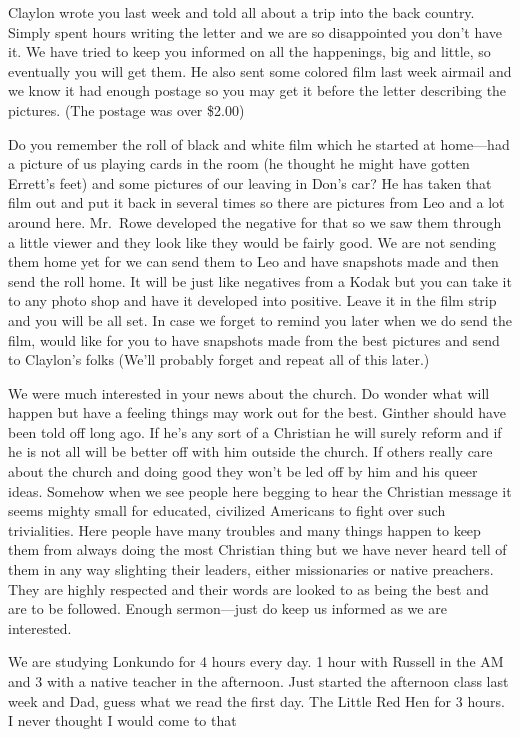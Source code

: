\documentclass[
]{book}
\begin{document}
Claylon wrote you last week and told all about a trip into the back country. Simply spent hours writing the letter and we are so disappointed you don't have it. We have tried to keep you informed on all the happenings, big and little, so eventually you will get them. He also sent some colored film last week airmail and we know it had enough postage so you may get it before the letter describing the pictures. (The postage was over \$2.00)

Do you remember the roll of black and white film which he started at home---had a picture of us playing cards in the room (he thought he might have gotten Errett's feet) and some pictures of our leaving in Don's car? He has taken that film out and put it back in several times so there are pictures from Leo and a lot around here. Mr.~Rowe developed the negative for that so we saw them through a little viewer and they look like they would be fairly good. We are not sending them home yet for we can send them to Leo and have snapshots made and then send the roll home. It will be just like negatives from a Kodak but you can take it to any photo shop and have it developed into positive. Leave it in the film strip and you will be all set. In case we forget to remind you later when we do send the film, would like for you to have snapshots made from the best pictures and send to Claylon's folks (We'll probably forget and repeat all of this later.)

We were much interested in your news about the church. Do wonder what will happen but have a feeling things may work out for the best. Ginther should have been told off long ago. If he's any sort of a Christian he will surely reform and if he is not all will be better off with him outside the church. If others really care about the church and doing good they won't be led off by him and his queer ideas. Somehow when we see people here begging to hear the Christian message it seems mighty small for educated, civilized Americans to fight over such trivialities. Here people have many troubles and many things happen to keep them from always doing the most Christian thing but we have never heard tell of them in any way slighting their leaders, either missionaries or native preachers. They are highly respected and their words are looked to as being the best and are to be followed. Enough sermon---just do keep us informed as we are interested.

We are studying Lonkundo for 4 hours every day. 1 hour with Russell in the AM and 3 with a native teacher in the afternoon. Just started the afternoon class last week and Dad, guess what we read the first day. The Little Red Hen for 3 hours. I never thought I would come to that
\end{document}

